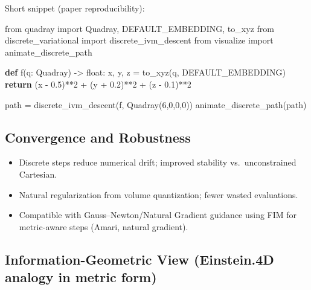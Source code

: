 \documentclass[
  10pt,
]{article}
\newenvironment{Shaded}{}{}
\newcommand{\BuiltInTok}[1]{#1}
\newcommand{\ControlFlowTok}[1]{\textcolor[rgb]{0.00,0.44,0.13}{\textbf{#1}}}
\newcommand{\DecValTok}[1]{\textcolor[rgb]{0.25,0.63,0.44}{#1}}
\newcommand{\FloatTok}[1]{\textcolor[rgb]{0.25,0.63,0.44}{#1}}
\newcommand{\ImportTok}[1]{#1}
\newcommand{\KeywordTok}[1]{\textcolor[rgb]{0.00,0.44,0.13}{\textbf{#1}}}
\newcommand{\NormalTok}[1]{#1}
\newcommand{\OperatorTok}[1]{\textcolor[rgb]{0.40,0.40,0.40}{#1}}
\providecommand{\tightlist}{%
  \setlength{\itemsep}{0pt}\setlength{\parskip}{0pt}}
\begin{document}
Short snippet (paper reproducibility):

\begin{Shaded}
\begin{Highlighting}[]
\ImportTok{from}\NormalTok{ quadray }\ImportTok{import}\NormalTok{ Quadray, DEFAULT\_EMBEDDING, to\_xyz}
\ImportTok{from}\NormalTok{ discrete\_variational }\ImportTok{import}\NormalTok{ discrete\_ivm\_descent}
\ImportTok{from}\NormalTok{ visualize }\ImportTok{import}\NormalTok{ animate\_discrete\_path}

\KeywordTok{def}\NormalTok{ f(q: Quadray) }\OperatorTok{{-}\textgreater{}} \BuiltInTok{float}\NormalTok{:}
\NormalTok{    x, y, z }\OperatorTok{=}\NormalTok{ to\_xyz(q, DEFAULT\_EMBEDDING)}
    \ControlFlowTok{return}\NormalTok{ (x }\OperatorTok{{-}} \FloatTok{0.5}\NormalTok{)}\OperatorTok{**}\DecValTok{2} \OperatorTok{+}\NormalTok{ (y }\OperatorTok{+} \FloatTok{0.2}\NormalTok{)}\OperatorTok{**}\DecValTok{2} \OperatorTok{+}\NormalTok{ (z }\OperatorTok{{-}} \FloatTok{0.1}\NormalTok{)}\OperatorTok{**}\DecValTok{2}

\NormalTok{path }\OperatorTok{=}\NormalTok{ discrete\_ivm\_descent(f, Quadray(}\DecValTok{6}\NormalTok{,}\DecValTok{0}\NormalTok{,}\DecValTok{0}\NormalTok{,}\DecValTok{0}\NormalTok{))}
\NormalTok{animate\_discrete\_path(path)}
\end{Highlighting}
\end{Shaded}

\hypertarget{convergence-and-robustness}{%
\subsection{Convergence and
Robustness}\label{convergence-and-robustness}}

\begin{itemize}
\tightlist
\item
  Discrete steps reduce numerical drift; improved stability
  vs.~unconstrained Cartesian.
\item
  Natural regularization from volume quantization; fewer wasted
  evaluations.
\item
  Compatible with Gauss--Newton/Natural Gradient guidance using FIM for
  metric-aware steps (Amari, natural gradient).
\end{itemize}

\hypertarget{information-geometric-view-einstein.4d-analogy-in-metric-form}{%
\subsection{Information-Geometric View (Einstein.4D analogy in metric
form)}\label{information-geometric-view-einstein.4d-analogy-in-metric-form}}
\end{document}
